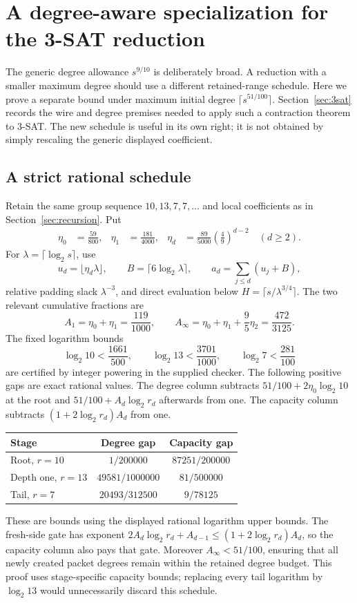 \section{A degree-aware specialization for the 3-SAT reduction}
\label{sec:low-degree}

The generic degree allowance $s^{9/10}$ is deliberately broad. A reduction
with a smaller maximum degree should use a different retained-range schedule.
Here we prove a separate bound under maximum initial degree
$\lceil s^{51/100}\rceil$. Section~\ref{sec:3sat} records the wire and degree
premises needed to apply such a contraction theorem to 3-SAT. The new
schedule is useful in its own right; it is not obtained by simply rescaling
the generic displayed coefficient.

\subsection{A strict rational schedule}

Retain the same group sequence $10,13,7,7,\ldots$ and local coefficients
as in Section~\ref{sec:recursion}. Put
\begin{align*}
 \eta_0&=\frac{59}{800},&
 \eta_1&=\frac{181}{4000},&
 \eta_d&=\frac{89}{5000}\left(\frac49\right)^{d-2}\quad(d\ge2).
\end{align*}
For $\lambda=\lceil\log_2s\rceil$, use
\[
 u_d=\lfloor\eta_d\lambda\rfloor,\qquad
 B=\lceil6\log_2\lambda\rceil,\qquad
 a_d=\sum_{j\le d}(u_j+B),
\]
relative padding slack $\lambda^{-3}$, and direct evaluation below
$H=\lceil s/\lambda^{3/4}\rceil$. The two relevant cumulative fractions are
\[
 A_1=\eta_0+\eta_1=\frac{119}{1000},\qquad
 A_\infty=\eta_0+\eta_1+\frac95\eta_2=\frac{472}{3125}.
\]
The fixed logarithm bounds
\[
 \log_2 10<\frac{1661}{500},\qquad
 \log_2 13<\frac{3701}{1000},\qquad
 \log_2 7<\frac{281}{100}
\]
are certified by integer powering in the supplied checker. The following
positive gaps are exact rational values. The degree column subtracts
$51/100+2\eta_0\log_2 10$ at the root and
$51/100+A_d\log_2 r_d$ afterwards from one. The capacity column subtracts
$(1+2\log_2r_d)A_d$ from one.
\begin{center}
\begin{tabular}{lcc}
\toprule
Stage & Degree gap & Capacity gap\\\midrule
Root, $r=10$ & $1/200000$ & $87251/200000$\\
Depth one, $r=13$ & $49581/1000000$ & $81/500000$\\
Tail, $r=7$ & $20493/312500$ & $9/78125$\\\bottomrule
\end{tabular}
\end{center}
These are bounds using the displayed rational logarithm upper bounds.
The fresh-side gate has exponent
$2A_d\log_2r_d+A_{d-1}\le(1+2\log_2r_d)A_d$, so the capacity column also
pays that gate. Moreover $A_\infty<51/100$, ensuring that all newly created
packet degrees remain within the retained degree budget. This proof uses
stage-specific capacity bounds; replacing every tail logarithm by
$\log_2 13$ would unnecessarily discard this schedule.

